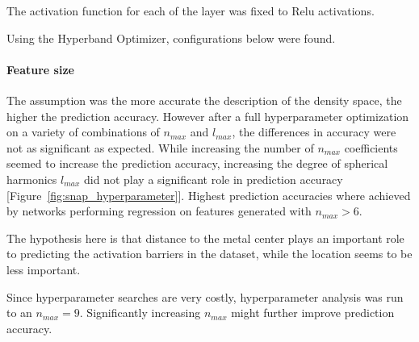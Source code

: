 The activation function for each of the layer was fixed to Relu activations.

Using the Hyperband Optimizer, configurations below were found.

\paragraph{Feature size}
The assumption was the more accurate the description of the density space, the higher the prediction accuracy.
However after a full hyperparameter optimization on a variety of combinations of $n_{max}$ and $l_{max}$,
the differences in accuracy were not as significant as expected.
While increasing the number of $n_{max}$ coefficients seemed to increase the prediction accuracy,
increasing the degree of spherical harmonics $l_{max}$ did not play a significant role in prediction accuracy [Figure~\ref{fig:snap_hyperparameter}].
Highest prediction accuracies where achieved by networks performing regression on features generated with $n_{max} > 6$.

The hypothesis here is that distance to the metal center plays an important role to predicting the activation
barriers in the dataset, while the location seems to be less important.

Since hyperparameter searches are very costly, hyperparameter analysis was run to an $n_{max} = 9$.
Significantly increasing $n_{max}$ might further improve prediction accuracy.

